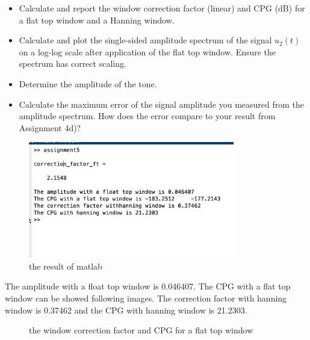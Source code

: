 \documentclass[
	a4paper,
	11pt,
]{article}
\begin{document}
\begin{itemize}
\item Calculate and report the window correction factor (linear) and CPG (dB) for a flat top window and a Hanning window.
\item Calculate and plot the single-sided amplitude spectrum of the signal \(u_2(t)\) on a log-log scale after application of the flat top window. Ensure the spectrum has correct scaling.
\item Determine the amplitude of the tone.
\item Calculate the maximum error of the signal amplitude you measured from the amplitude spectrum. How does the error compare to your result from Assignment 4d)?
\end{itemize}

\begin{figure}[htb!]
    \centerline{\includegraphics[width=9cm]{A5/answer.jpg}}
    \caption{the result of matlab}
\end{figure}

The amplitude with a float top window is 0.046407.
The CPG with a flat top window can be showed following images. The correction factor with hanning window is 0.37462 and the CPG with hanning window is 21.2303.
\newpage


\begin{figure}%
    \centering
    \qquad
    \caption{the window correction factor and CPG for a flat top window}%
    \label{fig:example}%
\end{figure}
\end{document}
